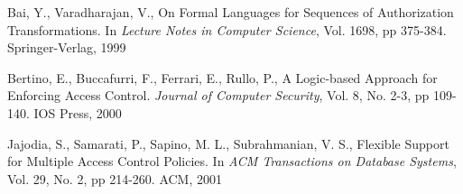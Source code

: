 \documentclass{llncs}
\begin{document}
  \begin{thebibliography}{5}
      Bai, Y., Varadharajan, V.,
      On Formal Languages for Sequences of Authorization Transformations.
      In \emph{Lecture Notes in Computer Science},
      Vol. 1698,
      pp 375-384.
      Springer-Verlag, 1999

      Bertino, E., Buccafurri, F., Ferrari, E., Rullo, P.,
      A Logic-based Approach for Enforcing Access Control.
      \emph{Journal of Computer Security},
      Vol. 8, No. 2-3,
      pp 109-140.
      IOS Press, 2000

      Jajodia, S., Samarati, P., Sapino, M. L., Subrahmanian, V. S.,
      Flexible Support for Multiple Access Control Policies.
      In \emph{ACM Transactions on Database Systems},
      Vol. 29, No. 2,
      pp 214-260.
      ACM, 2001
  \end{thebibliography}
\end{document}
